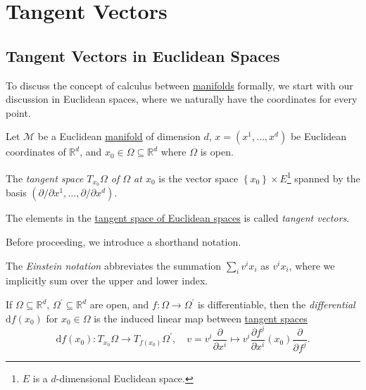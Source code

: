 \section{Tangent Vectors}
\subsection{Tangent Vectors in Euclidean Spaces}
To discuss the concept of calculus between \hyperref[def:smooth-manifold]{manifolds} formally, we start with our discussion in Euclidean spaces, where we naturally have the coordinates for every point.
\begin{definition*}
	Let \(\mathcal{M} \) be a Euclidean \hyperref[def:topological-manifold]{manifold} of dimension \(d\), \(x = (x^1, \ldots , x^d)\) be Euclidean coordinates of \(\mathbb{R} ^d\), and \(x_0\in \Omega \subseteq \mathbb{R} ^d\) where \(\Omega \) is open.
	\begin{definition}\label{def:tangent-space-of-Euclidean-space}
		The \emph{tangent space \(T_{x_0}\Omega \) of \(\Omega \) at \(x_0\)} is the vector space \(\left\{ x_0 \right\} \times E\)\footnote{\(E\) is a \(d\)-dimensional Euclidean space.} spanned by the basis \((\partial / \partial x^1, \ldots , \partial / \partial x^d)\).
	\end{definition}
	\begin{definition}\label{def:tangent-vector-of-Euclidean-space}
		The elements in the \hyperref[def:tangent-space-of-Euclidean-space]{tangent space of Euclidean spaces} is called \emph{tangent vectors}.
	\end{definition}
\end{definition*}

Before proceeding, we introduce a shorthand notation.

\begin{notation}
	The \emph{Einstein notation} abbreviates the summation \(\sum_{i} v^i x_i\) as \(v^i x_i\), where we implicitly sum over the upper and lower index.
\end{notation}

\begin{definition}\label{def:differential-of-Euclidean-space}
	If \(\Omega \subseteq \mathbb{R} ^d\), \(\Omega ^\prime \subseteq \mathbb{R} ^d\) are open, and \(f\colon \Omega \to \Omega ^\prime \) is differentiable, then the \emph{differential} \(\mathrm{d} f(x_0)\) for \(x_0 \in \Omega \) is the induced linear map between \hyperref[def:tangent-space-of-Euclidean-space]{tangent spaces}
	\[
		\mathrm{d} f(x_0) \colon T_{x_0}\Omega \to T_{f(x_0)}\Omega ^\prime,\quad
		v = v^i \frac{\partial }{\partial x^i} \mapsto v^i \frac{\partial f^j}{\partial x^i} (x_0) \frac{\partial }{\partial f^j}.
	\]
\end{definition}

